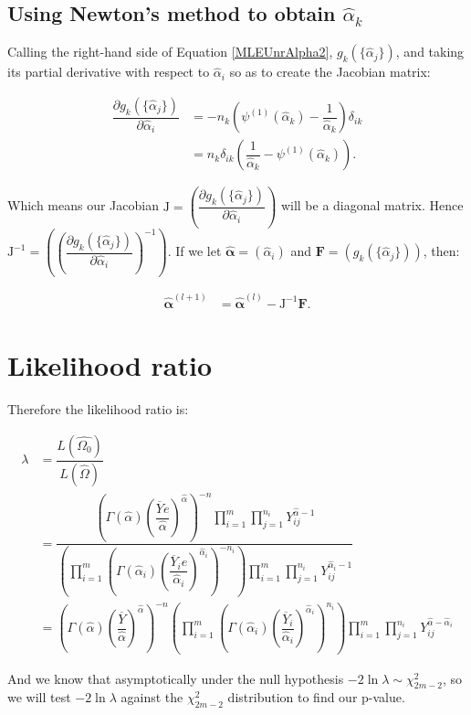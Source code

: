 \documentclass[12pt,a4paper]{article}
\newcommand{\eqn}[1]{Equation \ref{#1}}
\newcommand{\ovY}{\overline{Y}}
\newcommand{\wal}{\widehat{\alpha}}
\begin{document}
	\subsection{Using Newton's method to obtain $\wal_k$}
	Calling the right-hand side of \eqn{MLEUnrAlpha2}, $g_k(\{\wal_j\})$, and taking its partial derivative with respect to $\wal_i$ so as to create the Jacobian matrix:
	
	\begin{align*}
		\dfrac{\partial g_k(\{\wal_j\})}{\partial \wal_i} &= -n_k \left(\psi^{(1)}(\wal_k) - \dfrac{1}{\wal_k}\right)\delta_{ik} \\
		&= n_k \delta_{ik} \left(\dfrac{1}{\wal_k} - \psi^{(1)}(\wal_k)\right).
	\end{align*}

	Which means our Jacobian $\mathrm{J}=\left(\dfrac{\partial g_k(\{\wal_j\})}{\partial \wal_i}\right)$ will be a diagonal matrix. Hence $\mathrm{J}^{-1} = \left(\left(\dfrac{\partial g_k(\{\wal_j\})}{\partial \wal_i}\right)^{-1}\right)$. If we let $\boldsymbol{\wal} = (\wal_i)$ and $\mathbf{F} = (g_k(\{\wal_j\}))$, then:
	
	\begin{align*}
		\boldsymbol{\wal}^{(l+1)} &= \boldsymbol{\wal}^{(l)} - \mathrm{J}^{-1}\mathbf{F}.
	\end{align*}

	\section{Likelihood ratio}
	Therefore the likelihood ratio is:
	
	\begin{align*}
		\lambda &= \dfrac{L(\widehat{\Omega_0})}{L(\widehat{\Omega})} \\
		&= \dfrac{\left(\Gamma(\wal)\left(\dfrac{\ovY e}{\wal}\right)^{\wal}\right)^{-n} \prod_{i=1}^m \prod_{j=1}^{n_i} Y_{ij}^{\wal-1}}{\left(\prod_{i=1}^m\left(\Gamma(\wal_i)\left(\dfrac{\ovY_i e}{\wal_i}\right)^{\wal_i}\right)^{-n_i}\right) \prod_{i=1}^m \prod_{j=1}^{n_i} Y_{ij}^{\wal_i-1}} \\
		&= \left(\Gamma(\wal)\left(\dfrac{\ovY }{\wal}\right)^{\wal}\right)^{-n} \left(\prod_{i=1}^m\left(\Gamma(\wal_i)\left(\dfrac{\ovY_i }{\wal_i}\right)^{\wal_i}\right)^{n_i}\right)\prod_{i=1}^m \prod_{j=1}^{n_i} Y_{ij}^{\wal-\wal_i}
	\end{align*}

	And we know that asymptotically under the null hypothesis $-2\ln{\lambda} \sim \chi^2_{2m-2}$, so we will test $-2\ln{\lambda}$ against the $\chi^2_{2m-2}$ distribution to find our p-value.
\end{document}
